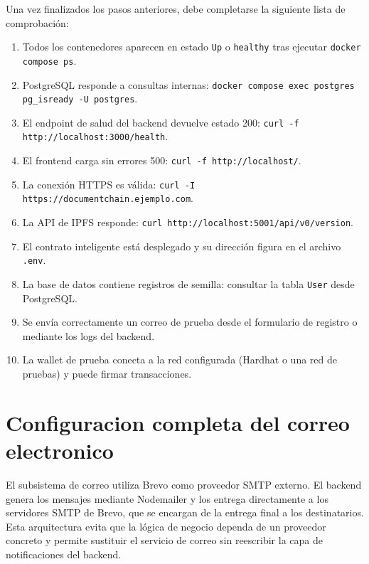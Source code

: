 \documentclass[11pt, a4paper]{article}
\begin{document}
Una vez finalizados los pasos anteriores, debe completarse la siguiente lista de comprobaci\'{o}n:

\begin{enumerate}[leftmargin=*]
    \item Todos los contenedores aparecen en estado \texttt{Up} o \texttt{healthy} tras ejecutar \texttt{docker compose ps}.
    \item PostgreSQL responde a consultas internas: \texttt{docker compose exec postgres pg\_isready -U postgres}.
    \item El endpoint de salud del backend devuelve estado 200: \texttt{curl -f http://localhost:3000/health}.
    \item El frontend carga sin errores 500: \texttt{curl -f http://localhost/}.
    \item La conexi\'{o}n HTTPS es v\'{a}lida: \texttt{curl -I https://documentchain.ejemplo.com}.
    \item La API de IPFS responde: \texttt{curl http://localhost:5001/api/v0/version}.
    \item El contrato inteligente est\'{a} desplegado y su direcci\'{o}n figura en el archivo \texttt{.env}.
    \item La base de datos contiene registros de semilla: consultar la tabla \texttt{User} desde PostgreSQL.
    \item Se env\'{i}a correctamente un correo de prueba desde el formulario de registro o mediante los logs del backend.
    \item La wallet de prueba conecta a la red configurada (Hardhat o una red de pruebas) y puede firmar transacciones.
\end{enumerate}

\section{Configuracion completa del correo electronico}

El subsistema de correo utiliza Brevo como proveedor SMTP externo. El backend genera los mensajes mediante Nodemailer y los entrega directamente a los servidores SMTP de Brevo, que se encargan de la entrega final a los destinatarios. Esta arquitectura evita que la l\'{o}gica de negocio dependa de un proveedor concreto y permite sustituir el servicio de correo sin reescribir la capa de notificaciones del backend.
\end{document}
